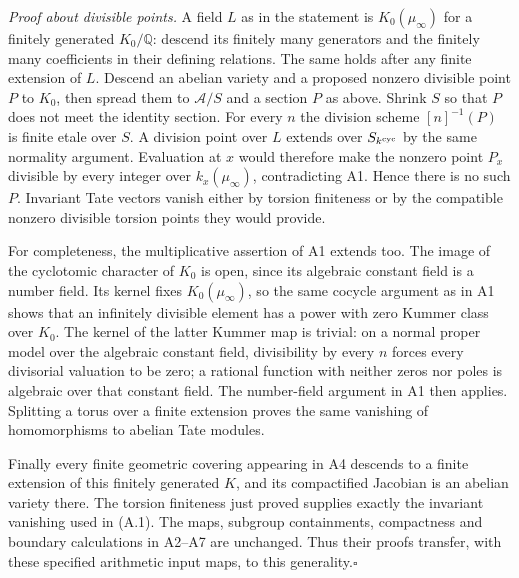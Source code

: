 \emph{Proof about divisible points.} A field $L$ as in the statement is $K_0(\mu_\infty)$ for a finitely generated $K_0/\mathbb Q$: descend its finitely many generators and the finitely many coefficients in their defining relations. The same holds after any finite extension of $L$. Descend an abelian variety and a proposed nonzero divisible point $P$ to $K_0$, then spread them to $\mathcal A/S$ and a section $P$ as above. Shrink $S$ so that $P$ does not meet the identity section. For every $n$ the division scheme $[n]^{-1}(P)$ is finite etale over $S$. A division point over $L$ extends over $S_{k^{\rm cyc}}$ by the same normality argument. Evaluation at $x$ would therefore make the nonzero point $P_x$ divisible by every integer over $k_x(\mu_\infty)$, contradicting A1. Hence there is no such $P$. Invariant Tate vectors vanish either by torsion finiteness or by the compatible nonzero divisible torsion points they would provide.

For completeness, the multiplicative assertion of A1 extends too. The image of the cyclotomic character of $K_0$ is open, since its algebraic constant field is a number field. Its kernel fixes $K_0(\mu_\infty)$, so the same cocycle argument as in A1 shows that an infinitely divisible element has a power with zero Kummer class over $K_0$. The kernel of the latter Kummer map is trivial: on a normal proper model over the algebraic constant field, divisibility by every $n$ forces every divisorial valuation to be zero; a rational function with neither zeros nor poles is algebraic over that constant field. The number-field argument in A1 then applies. Splitting a torus over a finite extension proves the same vanishing of homomorphisms to abelian Tate modules.

Finally every finite geometric covering appearing in A4 descends to a finite extension of this finitely generated $K$, and its compactified Jacobian is an abelian variety there. The torsion finiteness just proved supplies exactly the invariant vanishing used in (A.1). The maps, subgroup containments, compactness and boundary calculations in A2--A7 are unchanged. Thus their proofs transfer, with these specified arithmetic input maps, to this generality.\hfill$\square$

